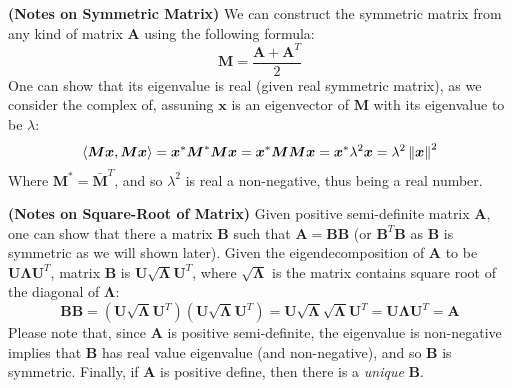 \begin{remark}{\textbf{(Notes on Symmetric Matrix)}}
    We can construct the symmetric matrix from any kind of matrix $\boldsymbol A$ using the following formula:
    \begin{equation*}
        \boldsymbol M = \frac{\boldsymbol A + \boldsymbol A^T}{2}
    \end{equation*}
    One can show that its eigenvalue is real (given real symmetric matrix), as we consider the complex of, assuning $\boldsymbol x$ is an eigenvector of $\boldsymbol M$ with its eigenvalue to be $\lambda$:
    \begin{equation*}
        \left\langle \boldsymbol M\boldsymbol x, \boldsymbol M\boldsymbol x \right\rangle = \boldsymbol x^*\boldsymbol M^*\boldsymbol M\boldsymbol x = \boldsymbol x^*\boldsymbol M\boldsymbol M\boldsymbol x = \boldsymbol x^*\lambda^2\boldsymbol x = \lambda^2\left\lVert\boldsymbol x\right\rVert^2
    \end{equation*}
    Where $\boldsymbol M^* = \bar{\boldsymbol M}^T$, and so $\lambda^2$ is real a non-negative, thus being a real number. 
\end{remark}

\begin{remark}{\textbf{(Notes on Square-Root of Matrix)}}
    Given positive semi-definite matrix $\boldsymbol A$, one can show that there a matrix $\boldsymbol B$ such that $\boldsymbol A = \boldsymbol B\boldsymbol B$ (or $\boldsymbol B^T\boldsymbol B$ as $\boldsymbol B$ is symmetric as we will shown later). Given the eigendecomposition of $\boldsymbol A$ to be $\boldsymbol U\boldsymbol \Lambda\boldsymbol U^T$, matrix $\boldsymbol B$ is $\boldsymbol U\sqrt{\boldsymbol \Lambda}\boldsymbol U^T$, where $\sqrt{\boldsymbol \Lambda}$ is the matrix contains square root of the diagonal of $\boldsymbol \Lambda$:
    \begin{equation*}
        \boldsymbol B\boldsymbol B = (\boldsymbol U\sqrt{\boldsymbol \Lambda}\boldsymbol U^T)(\boldsymbol U\sqrt{\boldsymbol \Lambda}\boldsymbol U^T) = \boldsymbol U\sqrt{\boldsymbol \Lambda}\sqrt{\boldsymbol \Lambda}\boldsymbol U^T = \boldsymbol U\boldsymbol \Lambda\boldsymbol U^T = \boldsymbol A
    \end{equation*}
    Please note that, since $\boldsymbol A$ is positive semi-definite, the eigenvalue is non-negative implies that $\boldsymbol B$ has real value eigenvalue (and non-negative), and so $\boldsymbol B$ is symmetric. Finally, if $\boldsymbol A$ is positive define, then there is a \emph{unique} $\boldsymbol B$.
\end{remark}

